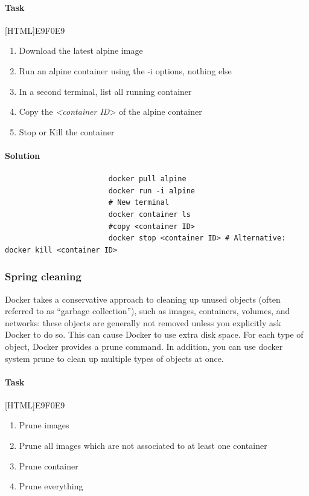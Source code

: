 \documentclass[12pt]{article}
\begin{document}
					\paragraph{Task}
						[HTML]{E9F0E9}{\parbox{\linewidth}{%
							\begin{enumerate}
								\item Download the latest alpine image
								\item Run an alpine container using the -i options, nothing else
								\item In a second terminal, list all running container
								\item Copy the \textit{<container ID}> of the alpine container
								\item Stop or Kill the container
							\end{enumerate}
					}}
					
			\paragraph{Solution}	

				\begin{minipage}{\linewidth}
					\begin{lstlisting}
						docker pull alpine
						docker run -i alpine
						# New terminal
						docker container ls
						#copy <container ID>
						docker stop <container ID> # Alternative: docker kill <container ID>
					\end{lstlisting}
				\end{minipage}

				\subsubsection{Spring cleaning}
					Docker takes a conservative approach to cleaning up unused objects (often referred to as “garbage collection”), such as images, containers, volumes, and networks: these objects are generally not removed unless you explicitly ask Docker to do so. 
					This can cause Docker to use extra disk space. 
					For each type of object, Docker provides a prune command. 
					In addition, you can use docker system prune to clean up multiple types of objects at once. 
					
					\paragraph{Task}
						[HTML]{E9F0E9}{\parbox{\linewidth}{%
							\begin{enumerate}
								\item Prune images
								\item Prune all images which are not associated to at least one container
								\item Prune container
								\item Prune everything
							\end{enumerate}
						}}
				
\end{document}
